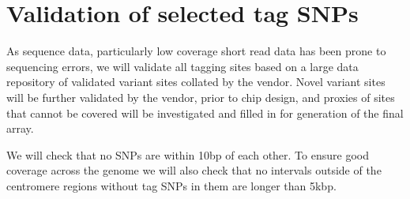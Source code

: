 \section{Validation of selected tag SNPs}

As sequence data, particularly low coverage short read data has been prone to sequencing errors, we will validate all tagging sites based on a large data repository of validated variant sites collated by the vendor. Novel variant sites will be further validated by the vendor, prior to chip design, and proxies of sites that cannot be covered will be investigated and filled in for generation of the final array.

We will check that no SNPs are within 10bp of each other. To ensure good coverage across the genome we will also check that no intervals outside of the centromere regions without tag SNPs in them are longer than 5kbp.